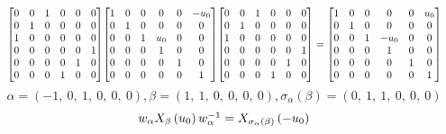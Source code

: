 \documentclass[11pt]{article}
\theoremstyle{definition}
\begin{document}
\[
\scaletoalign{\textwidth}{{\left[\begin{matrix}0 & 0 & 1 & 0 & 0 & 0\\0 & 1 & 0 & 0 & 0 & 0\\1 & 0 & 0 & 0 & 0 & 0\\0 & 0 & 0 & 0 & 0 & 1\\0 & 0 & 0 & 0 & 1 & 0\\0 & 0 & 0 & 1 & 0 & 0\end{matrix}\right]} {\left[\begin{matrix}1 & 0 & 0 & 0 & 0 & - u_{0}\\0 & 1 & 0 & 0 & 0 & 0\\0 & 0 & 1 & u_{0} & 0 & 0\\0 & 0 & 0 & 1 & 0 & 0\\0 & 0 & 0 & 0 & 1 & 0\\0 & 0 & 0 & 0 & 0 & 1\end{matrix}\right]} {\left[\begin{matrix}0 & 0 & 1 & 0 & 0 & 0\\0 & 1 & 0 & 0 & 0 & 0\\1 & 0 & 0 & 0 & 0 & 0\\0 & 0 & 0 & 0 & 0 & 1\\0 & 0 & 0 & 0 & 1 & 0\\0 & 0 & 0 & 1 & 0 & 0\end{matrix}\right]} = {\left[\begin{matrix}1 & 0 & 0 & 0 & 0 & u_{0}\\0 & 1 & 0 & 0 & 0 & 0\\0 & 0 & 1 & - u_{0} & 0 & 0\\0 & 0 & 0 & 1 & 0 & 0\\0 & 0 & 0 & 0 & 1 & 0\\0 & 0 & 0 & 0 & 0 & 1\end{matrix}\right]}}
\]
\[
\alpha = \left( -1, \  0, \  1, \  0, \  0, \  0\right), \beta = \left( 1, \  1, \  0, \  0, \  0, \  0\right), \sigma_{\alpha}(\beta) = \left( 0, \  1, \  1, \  0, \  0, \  0\right)
\]
\[
\scaletoalign{\textwidth}{w_{\alpha} X_{\beta}\left(u_{0}\right) w_{\alpha}^{-1} = X_{\sigma_{\alpha}\left(\beta\right)}\left(- u_{0}\right)}
\]
\end{document}
